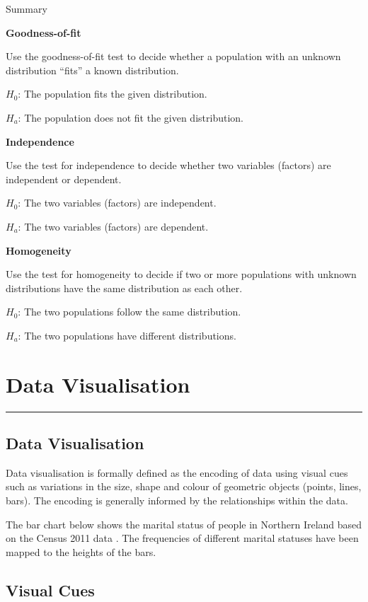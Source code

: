 \documentclass[
]{book}
\begin{document}
Summary

\textbf{Goodness-of-fit}

Use the goodness-of-fit test to decide whether a population with an unknown distribution ``fits'' a known distribution.

\(H_0\): The population fits the given distribution.

\(H_a\): The population does not fit the given distribution.

\textbf{Independence}

Use the test for independence to decide whether two variables (factors) are independent or dependent.

\(H_0\): The two variables (factors) are independent.

\(H_a\): The two variables (factors) are dependent.

\textbf{Homogeneity}

Use the test for homogeneity to decide if two or more populations with unknown distributions have the same distribution as each other.

\(H_0\): The two populations follow the same distribution.

\(H_a\): The two populations have different distributions.

\hypertarget{datvis}{%
\chapter{Data Visualisation}\label{datvis}}

\begin{center}\rule{0.5\linewidth}{0.5pt}\end{center}

\hypertarget{data-visualisation}{%
\section{Data Visualisation}\label{data-visualisation}}

Data visualisation is formally defined as the encoding of data using visual cues such as variations in the size, shape and colour of geometric objects (points, lines, bars). The encoding is generally informed by the relationships within the data.

The bar chart below shows the marital status of people in Northern Ireland based on the Census 2011 data \citep{census2011}. The frequencies of different marital statuses have been mapped to the heights of the bars.

\hypertarget{visual-cues}{%
\section{Visual Cues}\label{visual-cues}}
\end{document}
